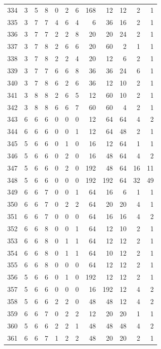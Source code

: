 \documentclass[11pt,a4paper]{article}
\begin{document}
\begin{longtable}{r|rrr|rrr|rrr|rr}
334 & 3 & 5 & 8 & 0 & 2 & 6 & 168 & 12 & 12 & 2 & 1\\
335 & 3 & 7 & 7 & 4 & 6 & 4 & 6 & 36 & 16 & 2 & 1\\
336 & 3 & 7 & 7 & 2 & 2 & 8 & 20 & 20 & 24 & 2 & 1\\
337 & 3 & 7 & 8 & 2 & 6 & 6 & 20 & 60 & 2 & 1 & 1\\
338 & 3 & 7 & 8 & 2 & 2 & 4 & 20 & 12 & 6 & 2 & 1\\
339 & 3 & 7 & 7 & 6 & 6 & 8 & 36 & 36 & 24 & 6 & 1\\
340 & 3 & 7 & 8 & 6 & 2 & 6 & 36 & 12 & 10 & 2 & 1\\
341 & 3 & 8 & 8 & 2 & 6 & 5 & 12 & 60 & 10 & 2 & 1\\
342 & 3 & 8 & 8 & 6 & 6 & 7 & 60 & 60 & 4 & 2 & 1\\
343 & 6 & 6 & 6 & 0 & 0 & 0 & 12 & 64 & 64 & 4 & 2\\
344 & 6 & 6 & 6 & 0 & 0 & 1 & 12 & 64 & 48 & 2 & 1\\
345 & 5 & 6 & 6 & 0 & 1 & 0 & 16 & 12 & 64 & 1 & 1\\
346 & 5 & 6 & 6 & 0 & 2 & 0 & 16 & 48 & 64 & 4 & 2\\
347 & 5 & 6 & 6 & 0 & 2 & 0 & 192 & 48 & 64 & 16 & 11\\
348 & 5 & 6 & 6 & 0 & 0 & 0 & 192 & 192 & 64 & 32 & 49\\
349 & 6 & 6 & 7 & 0 & 0 & 1 & 64 & 16 & 6 & 1 & 1\\
350 & 6 & 6 & 7 & 0 & 2 & 2 & 64 & 20 & 20 & 4 & 1\\
351 & 6 & 6 & 7 & 0 & 0 & 0 & 64 & 16 & 16 & 4 & 2\\
352 & 6 & 6 & 8 & 0 & 0 & 1 & 64 & 12 & 10 & 2 & 1\\
353 & 6 & 6 & 8 & 0 & 1 & 1 & 64 & 12 & 12 & 2 & 1\\
354 & 6 & 6 & 8 & 0 & 1 & 1 & 64 & 10 & 12 & 2 & 1\\
355 & 6 & 6 & 8 & 0 & 0 & 0 & 64 & 12 & 12 & 2 & 1\\
356 & 5 & 6 & 6 & 0 & 1 & 0 & 192 & 12 & 12 & 2 & 1\\
357 & 5 & 6 & 6 & 0 & 0 & 0 & 16 & 192 & 12 & 4 & 2\\
358 & 5 & 6 & 6 & 2 & 2 & 0 & 48 & 48 & 12 & 4 & 2\\
359 & 6 & 6 & 7 & 0 & 2 & 2 & 12 & 20 & 20 & 1 & 1\\
360 & 5 & 6 & 6 & 2 & 2 & 1 & 48 & 48 & 48 & 4 & 2\\
361 & 6 & 6 & 7 & 1 & 2 & 2 & 48 & 20 & 20 & 2 & 1\\

\end{longtable}
\end{document}
